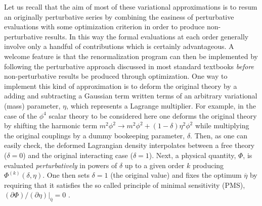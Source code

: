 \documentclass[a4paper,11pt]{article}
\begin{document}
Let us recall that the aim of most of these   variational approximations  is   to resum an originally perturbative series by combining the easiness of perturbative evaluations with some optimization criterion in order to produce non-perturbative results. In this way  the formal evaluations at each order generally involve only a handful of contributions which is certainly advantageous. A welcome feature is that the  renormalization program  can then be implemented by following the perturbative approach discussed in most standard textbooks {\it before} non-perturbative  results be produced through optimization. One way to implement this kind of approximation is to deform the original theory by a adding and subtracting a Gaussian term written terms of an arbitrary variational (mass) parameter, $\eta$, which represents a Lagrange multiplier. For example, in the case of the  $\phi^4$ scalar  theory to be considered here one deforms the original theory by shifting  the harmonic term $m^2 \phi^2 \to m^2\phi^2 + (1-\delta) \eta^2 \phi^2$  while multiplying the original couplings by a dummy   bookeeping parameter, $\delta$. Then, as one can easily check, the deformed Lagrangian density  interpolates between a free theory ($\delta =0$) and the original interacting case ($\delta =1$). Next, a physical quantity, $\Phi$, is evaluated {\it perturbatively } in powers of $\delta$ up to a given order $k$ producing $\Phi^{(k)}(\delta,\eta)$. One then sets $\delta=1$ (the original value) and fixes the optimum $\overline \eta$ by requiring that it satisfies the so called principle of minimal sensitivity (PMS), $(\partial \Phi)/(\partial \eta)|_{\overline \eta} =0$ \cite{pms1,pms2}.
\end{document}
